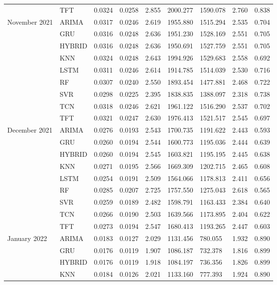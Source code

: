 \begin{tabular}{lllllllll}
 & TFT & 0.0324 & 0.0258 & 2.855 & 2000.277 & 1590.078 & 2.760 & 0.838 \\
November 2021 & ARIMA & 0.0317 & 0.0246 & 2.619 & 1955.880 & 1515.294 & 2.535 & 0.704 \\
 & GRU & 0.0316 & 0.0248 & 2.636 & 1951.230 & 1528.169 & 2.551 & 0.705 \\
 & HYBRID & 0.0316 & 0.0248 & 2.636 & 1950.691 & 1527.759 & 2.551 & 0.705 \\
 & KNN & 0.0324 & 0.0248 & 2.643 & 1994.926 & 1529.683 & 2.558 & 0.692 \\
 & LSTM & 0.0311 & 0.0246 & 2.614 & 1914.785 & 1514.039 & 2.530 & 0.716 \\
 & RF & 0.0307 & 0.0240 & 2.550 & 1893.454 & 1477.881 & 2.468 & 0.722 \\
 & SVR & 0.0298 & 0.0225 & 2.395 & 1838.835 & 1388.097 & 2.318 & 0.738 \\
 & TCN & 0.0318 & 0.0246 & 2.621 & 1961.122 & 1516.290 & 2.537 & 0.702 \\
 & TFT & 0.0321 & 0.0247 & 2.630 & 1976.413 & 1521.517 & 2.545 & 0.697 \\
December 2021 & ARIMA & 0.0276 & 0.0193 & 2.543 & 1700.735 & 1191.622 & 2.443 & 0.593 \\
 & GRU & 0.0260 & 0.0194 & 2.544 & 1600.773 & 1195.036 & 2.444 & 0.639 \\
 & HYBRID & 0.0260 & 0.0194 & 2.545 & 1603.821 & 1195.195 & 2.445 & 0.638 \\
 & KNN & 0.0271 & 0.0195 & 2.566 & 1669.309 & 1202.715 & 2.465 & 0.608 \\
 & LSTM & 0.0254 & 0.0191 & 2.509 & 1564.066 & 1178.813 & 2.411 & 0.656 \\
 & RF & 0.0285 & 0.0207 & 2.725 & 1757.550 & 1275.043 & 2.618 & 0.565 \\
 & SVR & 0.0259 & 0.0189 & 2.482 & 1598.791 & 1163.433 & 2.384 & 0.640 \\
 & TCN & 0.0266 & 0.0190 & 2.503 & 1639.566 & 1173.895 & 2.404 & 0.622 \\
 & TFT & 0.0273 & 0.0194 & 2.547 & 1680.413 & 1193.265 & 2.447 & 0.603 \\
January 2022 & ARIMA & 0.0183 & 0.0127 & 2.029 & 1131.456 & 780.055 & 1.932 & 0.890 \\
 & GRU & 0.0176 & 0.0119 & 1.907 & 1086.187 & 732.378 & 1.816 & 0.899 \\
 & HYBRID & 0.0176 & 0.0119 & 1.918 & 1084.197 & 736.356 & 1.826 & 0.899 \\
 & KNN & 0.0184 & 0.0126 & 2.021 & 1133.160 & 777.393 & 1.924 & 0.890 \\

\end{tabular}
